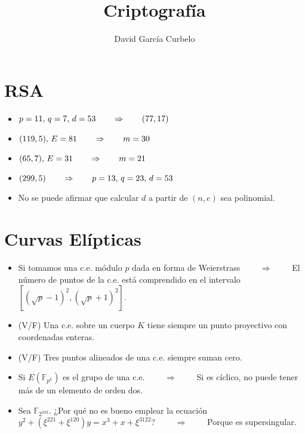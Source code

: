 \documentclass[fleqn]{article}
\author{David García Curbelo}
\title{Criptografía}
\def\F{\mathds{F}}
\def\next{\qquad \Rightarrow \qquad}
\begin{document}
    \section{RSA}
    \begin{itemize}
        \item $p = 11, \thinspace q = 7, \thinspace d = 53 \next (77, 17)$
        \item $(119, 5), \thinspace E = 81 \next m = 30$
        \item $(65, 7), \thinspace E = 31 \next m = 21$
        \item $(299, 5) \next p = 13, \thinspace q = 23, \thinspace d = 53$
        \item No se puede afirmar que calcular $d$ a partir de $(n, e)$ sea polinomial.
    \end{itemize}

    \section{Curvas Elípticas}
    \begin{itemize}
        \item Si tomamos una c.e. módulo $p$ dada en forma de Weierstrass $\next$ El número de puntos de la c.e. está comprendido en el intervalo $[(\sqrt{p} - 1)^2, (\sqrt{p} + 1)^2]$.
        \item (V/F) Una c.e. sobre un cuerpo $K$ tiene siempre un punto proyectivo con coordenadas enteras.
        \item (V/F) Tres puntos alineados de una c.e. siempre suman cero.
        \item Si $E(\F_{p^k})$ es el grupo de una c.e. $\next$ Si es cíclico, no puede tener más de un elemento de orden dos.
        \item Sea $\F_{2^{233}}$. ¿Por qué no es bueno emplear la ecuación $y^2 + (\xi^{221} + \xi^{120})y = x^3 + x + \xi^{3122}$? $\next$ Porque es supersingular.
    \end{itemize}
\end{document}
